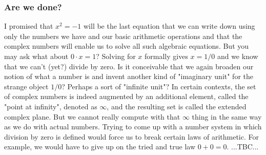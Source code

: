 \subsubsection{Are we done?}
I promised that $x^2 = -1$ will be the last equation that we can write down using only the numbers we have and our basic arithmetic operations and that the complex numbers will enable us to solve all such algebraic equations. But you may ask what about $0 \cdot x = 1$? Solving for $x$ formally gives $x = 1/0$ and we know that we can't (yet?) divide by zero. Is it conceivable that we again broaden our notion of what a number is and invent another kind of "imaginary unit" for the strange object $1/0$? Perhaps a sort of "infinite unit"? In certain contexts, the set of complex numbers is indeed augmented by an additional element, called the "point at infinity", denoted as $\infty$, and the resulting set is called the extended complex plane. But we cannot really compute with that $\infty$ thing in the same way as we do with actual numbers. Trying to come up with a number system in which division by zero is defined would force us to break certain laws of arithmetic. For example, we would have to give up on the tried and true law $0 + 0 = 0$. ...TBC...



